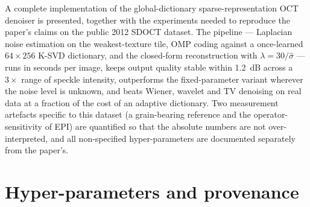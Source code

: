 \documentclass[11pt,a4paper]{article}
\newcommand{\sh}{\hat{\sigma}}
\begin{document}
A complete implementation of the global-dictionary sparse-representation OCT denoiser is presented, together with
the experiments needed to reproduce the paper's claims on the public 2012 SDOCT dataset. The pipeline --- Laplacian
noise estimation on the weakest-texture tile, OMP coding against a once-learned $64\times256$ K-SVD dictionary, and
the closed-form reconstruction with $\lambda=30/\sh$ --- runs in seconds per image, keeps output quality stable
within \SI{1.2}{dB} across a $3\times$ range of speckle intensity, outperforms the fixed-parameter variant wherever
the noise level is unknown, and beats Wiener, wavelet and TV denoising on real data at a fraction of the cost of an
adaptive dictionary. Two measurement artefacts specific to this dataset (a grain-bearing reference and the
operator-sensitivity of EPI) are quantified so that the absolute numbers are not over-interpreted, and all
non-specified hyper-parameters are documented separately from the paper's.

\appendix

\section{Hyper-parameters and provenance}\label{app:hyper}
\end{document}
